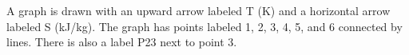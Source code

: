 A graph is drawn with an upward arrow labeled T (K) and a horizontal arrow labeled S (kJ/kg). The graph has points labeled 1, 2, 3, 4, 5, and 6 connected by lines. There is also a label P23 next to point 3.
